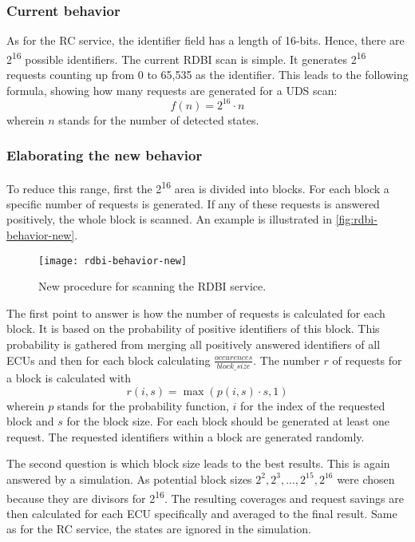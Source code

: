 \subsubsection{Current behavior}

As for the RC service, the identifier field has a length of 16-bits. Hence, there are 2\textsuperscript{16} possible identifiers.
The current RDBI scan is simple. It generates 2\textsuperscript{16} requests counting up from 0 to 65,535 as the identifier. This leads to the following formula, showing how many requests are generated for a UDS scan:
\[f(n)=2^{16} \cdot n\]
wherein $n$ stands for the number of detected states. 

\subsubsection{Elaborating the new behavior}
\label{subsubsec:rdbi-behavior}

To reduce this range, first the 2\textsuperscript{16} area is divided into blocks. For each block a specific number of requests is generated. If any of these requests is answered positively, the whole block is scanned.  An example is illustrated in \autoref{fig:rdbi-behavior-new}.

\begin{figure}[h]
    \centering
    \texttt{[image: rdbi-behavior-new]}
    \caption{New procedure for scanning the RDBI service.}
    \label{fig:rdbi-behavior-new}
\end{figure}

The first point to answer is how the number of requests is calculated for each block. It is based on the probability of positive identifiers of this block. This probability is gathered from merging all positively answered identifiers of all ECUs and then for each block calculating $\frac{occurences}{block\_size}$. The number $r$ of requests for a block is calculated with
\[r(i, s)=\max(p(i, s) \cdot s, 1)\]
wherein $p$ stands for the probability function, $i$ for the index of the requested block and $s$ for the block size. For each block should be generated at least one request. The requested identifiers within a block are generated randomly.

The second question is which block size leads to the best results. This is again answered by a simulation. As potential block sizes $2^2, 2^3, ..., 2^{15}, 2^{16}$ were chosen because they are divisors for 2\textsuperscript{16}. The resulting coverages and request savings are then calculated for each ECU specifically and averaged to the final result. Same as for the RC service, the states are ignored in the simulation.

